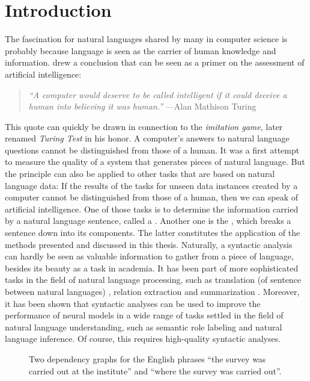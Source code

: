 \documentclass[../document.tex]{subfiles}
\begin{document}
    \chapter{Introduction}
    The fascination for natural languages shared by many in computer science is probably because language is seen as the carrier of human knowledge and information.
     drew a conclusion that can be seen as a primer on the assessment of artificial intelligence:
    \begin{quote}
        \emph{``A computer would deserve to be called intelligent if it could deceive a human into believing it was human.''} \hfill ---Alan Mathison Turing
    \end{quote}
    This quote can quickly be drawn in connection to the \emph{imitation game}, later renamed \emph{Turing Test} in his honor.
    A computer's answers to natural language questions cannot be distinguished from those of a human.
    It was a first attempt to measure the quality of a system that generates pieces of natural language.
    But the principle can also be applied to other tasks that are based on natural language data:
        If the results of the tasks for unseen data instances created by a computer cannot be distinguished from those of a human, then we can speak of artificial intelligence.
    One of those tasks is to determine the information carried by a natural language sentence, called a .
    Another one is the , which breaks a sentence down into its components.
    The latter constitutes the application of the methods presented and discussed in this thesis.
    Naturally, a syntactic analysis can hardly be seen as valuable information to gather from a piece of language, besides its beauty as a task in academia.
    It has been part of more sophisticated tasks in the field of natural language processing, such as translation (of sentence between natural languages) \citep{Zhang19,Yang22}, relation extraction \citep{Ngu19} and summarization \citep{Bal21}.
    Moreover, it has been shown that syntactic analyses can be used to improve the performance of neural models in a wide range of tasks settled in the field of natural language understanding, such as semantic role labeling and natural language inference. \citep{Liu19, Wang19, Fei20}
    Of course, this requires high-quality syntactic analyses.
    
    \begin{figure}
        \null\hfill
        
        \hfill
        
        \hfill\null
        \caption{\label{fig:dependency}
            Two dependency graphs for the English phrases ``the survey was carried out at the institute'' and ``where the survey was carried out''.
        }
    \end{figure}
    
\end{document}
